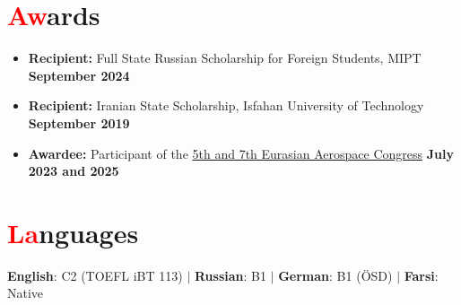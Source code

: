 \documentclass[a4paper, 11pt]{article}
\newcommand{\resumeItem}[1]{
    \item\small{
        {#1 \vspace{-2pt}}
    }
}
\begin{document}
\section{{\textcolor{red}{Aw}ards}}
\begin{itemize}
     \resumeItem{\textbf{Recipient:} Full State Russian Scholarship for Foreign Students, MIPT} \hfill \textbf{September 2024}
    \resumeItem{\textbf{Recipient:} Iranian State Scholarship, Isfahan University of Technology} \hfill \textbf{September 2019}
    \resumeItem{\textbf{Awardee:} Participant of the \href{https://congress.aero/en/}{5th and 7th Eurasian Aerospace Congress}} \hfill \textbf{July 2023 and 2025}

\end{itemize}
\vspace{-15pt}

\section{{\textcolor{red}{La}nguages}}
\begin{center}
    \textbf{English}: C2 (TOEFL iBT 113) \quad $|$ \quad 
    \textbf{Russian}: B1 \quad $|$ \quad 
    \textbf{German}: B1 (ÖSD) \quad $|$ \quad 
    \textbf{Farsi}: Native
\end{center}
\end{document}
